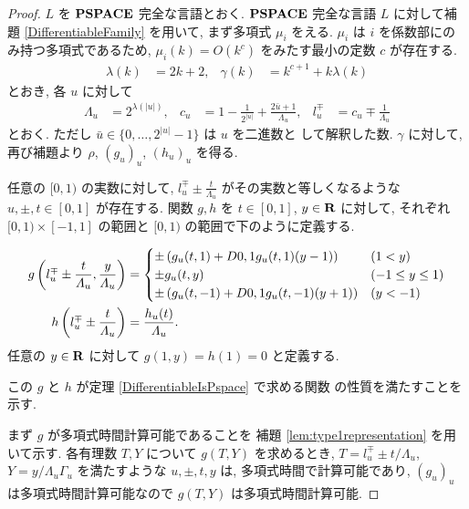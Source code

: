 \begin{proof}
 $L$ を $\mathbf{PSPACE}$ 完全な言語とおく.
 $\mathbf{PSPACE}$ 完全な言語 $L$ に対して補題 \ref{DifferentiableFamily} を用いて,
 まず多項式 $\mu_i$ をえる.
 $\mu_i$ は $i$ を係数部にのみ持つ多項式であるため,
 $\mu_i(k) = O(k^c)$ をみたす最小の定数 $c$ が存在する.
 \begin{align}
  \lambda(k) &= 2k + 2,&
  \gamma(k) &= k^{c+1} + k \lambda(k)
 \end{align}
 とおき, 各 $u$ に対して 
\begin{align}
 \Lambda_u 
 &= 2^{\lambda(|u|)}, &
 c_u 
 &= 1-\frac{1}{2^{|u|}}+\frac{2\bar{u}+1}{\Lambda_u}, &
 l_u^\mp 
 &= c_u\mp\frac{1}{\varLambda_u} 
\end{align}  
 とおく. ただし $\bar u \in \{0, \dots, 2^{|u|} - 1\}$ は $u$ を二進数と
 して解釈した数.
 $\gamma$ に対して, 再び補題より $\rho$, $(g_u)_u$, $(h_u)_u$ を得る.



 任意の $[0,1)$ の実数に対して,
 $l^\mp_u \pm \frac{t}{\Lambda_u}$ がその実数と等しくなるような
 $u, \pm, t\in [0,1]$ が存在する.
 関数 $g, h$ を $t \in [0,1]$, $y \in \mathbf R$ に対して,
 それぞれ $[0,1) \times [-1,1]$ の範囲と $[0,1)$ の範囲で下のように定義する.

 \begin{align}
  g\left(l^\mp_u \pm \frac{t}{\varLambda_u}, \frac{y}{\varLambda_u}\right)
  &= \begin{cases}
      \pm \left( g_u(t,1) 
      + D{0,1}g_u(t, 1)(y-1) \right)&  (1<y)\\
      \pm g_u(t, y) & (-1 \le y \le 1) \\
      \pm \left( g_u(t, -1) + D{0,1} g_u(t, -1)(y+1) \right) & (y<-1)
     \end{cases}
  \\
  h \left( l^\mp_u \pm \frac{t}{\varLambda_u} \right) 
  &= \frac{h_u(t)}{\varLambda_u}.
\end{align}
 任意の $y \in \mathbf R$ に対して $g(1,y) = h(1) = 0$ と定義する.



 この $g$ と $h$ が定理 \ref{DifferentiableIsPspace} で求める関数
 の性質を満たすことを示す.


 
 まず $g$ が多項式時間計算可能であることを
 補題 \ref{lem:type1representation} を用いて示す.
 各有理数 $T,Y$ について $g(T, Y)$ を求めるとき,
 $T=l_u^\mp \pm t/\Lambda_u$, $Y = y/\Lambda_u\Gamma_u$ を満たすような
 $u, \pm, t, y$ は, 多項式時間で計算可能であり,
 $(g_u)_u$ は多項式時間計算可能なので $g(T, Y)$ は多項式時間計算可能.




\end{proof}
